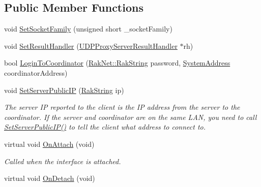 \subsection*{Public Member Functions}
\begin{DoxyCompactItemize}
\item 
void \hyperlink{class_rak_net_1_1_u_d_p_proxy_server_a8199854134e7999703f64c2cb0f31506}{Set\-Socket\-Family} (unsigned short \-\_\-socket\-Family)
\item 
void \hyperlink{class_rak_net_1_1_u_d_p_proxy_server_aabdc998e85afbce5190711262318468c}{Set\-Result\-Handler} (\hyperlink{struct_rak_net_1_1_u_d_p_proxy_server_result_handler}{U\-D\-P\-Proxy\-Server\-Result\-Handler} $\ast$rh)
\item 
bool \hyperlink{class_rak_net_1_1_u_d_p_proxy_server_a32edaff2aec11cce6a138897b0e2a158}{Login\-To\-Coordinator} (\hyperlink{class_rak_net_1_1_rak_string}{Rak\-Net\-::\-Rak\-String} password, \hyperlink{struct_rak_net_1_1_system_address}{System\-Address} coordinator\-Address)
\item 
void \hyperlink{class_rak_net_1_1_u_d_p_proxy_server_aeb6440f4e5f44f75a940c45538340e15}{Set\-Server\-Public\-I\-P} (\hyperlink{class_rak_net_1_1_rak_string}{Rak\-String} ip)
\begin{DoxyCompactList}\small\item\em The server I\-P reported to the client is the I\-P address from the server to the coordinator. If the server and coordinator are on the same L\-A\-N, you need to call \hyperlink{class_rak_net_1_1_u_d_p_proxy_server_aeb6440f4e5f44f75a940c45538340e15}{Set\-Server\-Public\-I\-P()} to tell the client what address to connect to. \end{DoxyCompactList}\item 
\hypertarget{class_rak_net_1_1_u_d_p_proxy_server_a47ebde04af6efb122dbcf3994b9faa3f}{virtual void \hyperlink{class_rak_net_1_1_u_d_p_proxy_server_a47ebde04af6efb122dbcf3994b9faa3f}{On\-Attach} (void)}\label{class_rak_net_1_1_u_d_p_proxy_server_a47ebde04af6efb122dbcf3994b9faa3f}

\begin{DoxyCompactList}\small\item\em Called when the interface is attached. \end{DoxyCompactList}\item 
\hypertarget{class_rak_net_1_1_u_d_p_proxy_server_aa0bf0313fe56e485dc5be8c5b72a9c75}{virtual void \hyperlink{class_rak_net_1_1_u_d_p_proxy_server_aa0bf0313fe56e485dc5be8c5b72a9c75}{On\-Detach} (void)}\label{class_rak_net_1_1_u_d_p_proxy_server_aa0bf0313fe56e485dc5be8c5b72a9c75}


\end{DoxyCompactItemize}
